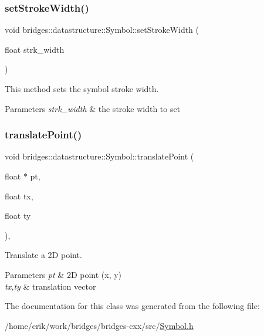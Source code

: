 \subsubsection{\texorpdfstring{set\+Stroke\+Width()}{setStrokeWidth()}}
{\footnotesize\ttfamily void bridges\+::datastructure\+::\+Symbol\+::set\+Stroke\+Width (\begin{DoxyParamCaption}\item[{float}]{strk\+\_\+width }\end{DoxyParamCaption})\hspace{0.3cm}{\ttfamily [inline]}}



This method sets the symbol stroke width. 


\begin{DoxyParams}{Parameters}
{\em strk\+\_\+width} & the stroke width to set \\
\hline
\end{DoxyParams}
\mbox{\label{classbridges_1_1datastructure_1_1_symbol_a3331549f82faa00d8fee5f51ca547cb0}} 
\subsubsection{\texorpdfstring{translate\+Point()}{translatePoint()}}
{\footnotesize\ttfamily void bridges\+::datastructure\+::\+Symbol\+::translate\+Point (\begin{DoxyParamCaption}\item[{float $\ast$}]{pt,  }\item[{float}]{tx,  }\item[{float}]{ty }\end{DoxyParamCaption})\hspace{0.3cm}{\ttfamily [inline]}, {\ttfamily [protected]}}



Translate a 2D point. 


\begin{DoxyParams}{Parameters}
{\em pt} & 2D point (x, y) \\
\hline
{\em tx,ty} & translation vector \\
\hline
\end{DoxyParams}


The documentation for this class was generated from the following file\+:\begin{DoxyCompactItemize}
\item 
/home/erik/work/bridges/bridges-\/cxx/src/\hyperlink{_symbol_8h}{Symbol.\+h}\end{DoxyCompactItemize}
